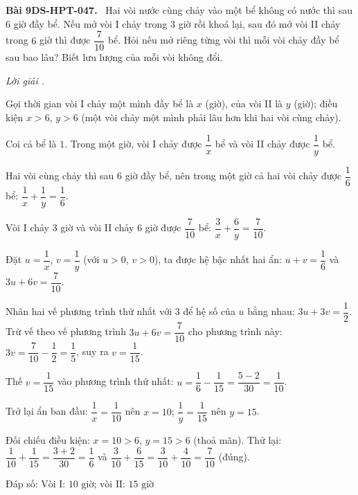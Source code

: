 \documentclass[12pt,a4paper]{article}
\newenvironment{problem}[1][]{\par\medskip\noindent\textbf{Bài #1.}\ }{\par}
\newenvironment{solution}[1][]{\par\noindent\textit{Lời giải #1.}\par}{\par}
\begin{document}
\begin{problem}[9DS-HPT-047]
Hai vòi nước cùng chảy vào một bể không có nước thì sau $6$ giờ đầy bể. Nếu mở vòi I chảy trong $3$ giờ rồi khoá lại, sau đó mở vòi II chảy trong $6$ giờ thì được $\dfrac{7}{10}$ bể. Hỏi nếu mở riêng từng vòi thì mỗi vòi chảy đầy bể sau bao lâu? Biết lưu lượng của mỗi vòi không đổi.

\begin{solution}
Gọi thời gian vòi I chảy một mình đầy bể là $x$ (giờ), của vòi II là $y$ (giờ); điều kiện $x > 6$, $y > 6$ (một vòi chảy một mình phải lâu hơn khi hai vòi cùng chảy).

Coi cả bể là $1$. Trong một giờ, vòi I chảy được $\dfrac{1}{x}$ bể và vòi II chảy được $\dfrac{1}{y}$ bể.

Hai vòi cùng chảy thì sau $6$ giờ đầy bể, nên trong một giờ cả hai vòi chảy được $\dfrac{1}{6}$ bể: $\dfrac{1}{x} + \dfrac{1}{y} = \dfrac{1}{6}$.

Vòi I chảy $3$ giờ và vòi II chảy $6$ giờ được $\dfrac{7}{10}$ bể: $\dfrac{3}{x} + \dfrac{6}{y} = \dfrac{7}{10}$.

Đặt $u = \dfrac{1}{x}$, $v = \dfrac{1}{y}$ (với $u > 0$, $v > 0$), ta được hệ bậc nhất hai ẩn: $u + v = \dfrac{1}{6}$ và $3u + 6v = \dfrac{7}{10}$.

Nhân hai vế phương trình thứ nhất với $3$ để hệ số của $u$ bằng nhau: $3u + 3v = \dfrac{1}{2}$. Trừ vế theo vế phương trình $3u + 6v = \dfrac{7}{10}$ cho phương trình này: $3v = \dfrac{7}{10} - \dfrac{1}{2} = \dfrac{1}{5}$, suy ra $v = \dfrac{1}{15}$.

Thế $v = \dfrac{1}{15}$ vào phương trình thứ nhất: $u = \dfrac{1}{6} - \dfrac{1}{15} = \dfrac{5 - 2}{30} = \dfrac{1}{10}$.

Trở lại ẩn ban đầu: $\dfrac{1}{x} = \dfrac{1}{10}$ nên $x = 10$; $\dfrac{1}{y} = \dfrac{1}{15}$ nên $y = 15$.

Đối chiếu điều kiện: $x = 10 > 6$, $y = 15 > 6$ (thoả mãn). Thử lại: $\dfrac{1}{10} + \dfrac{1}{15} = \dfrac{3 + 2}{30} = \dfrac{1}{6}$ và $\dfrac{3}{10} + \dfrac{6}{15} = \dfrac{3}{10} + \dfrac{4}{10} = \dfrac{7}{10}$ (đúng).

Đáp số: $\boxed{\text{Vòi I: } 10 \text{ giờ; vòi II: } 15 \text{ giờ}}$
\end{solution}
\end{problem}
\end{document}
